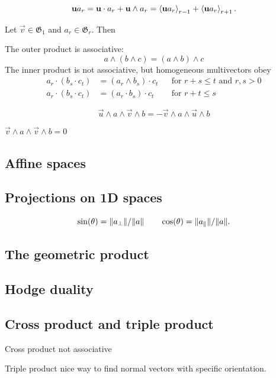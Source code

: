 \begin{lemma}
\[ \boldsymbol{\mathrm{u}}a_r = \boldsymbol{\mathrm{u}}\cdot a_r + \boldsymbol{\mathrm{u}}\wedge a_r = \left\langle \boldsymbol{\mathrm{u}}a_r \right\rangle_{r-1} + \left\langle \boldsymbol{\mathrm{u}}a_r \right\rangle_{r+1}. \]
\end{lemma}

\begin{proposition}
Let $\vec{v}\in\mathfrak{G}_1$ and $a_r\in\mathfrak{G}_r$. Then

\end{proposition}





\begin{lemma}
The outer product is associative:
\[ a\wedge(b\wedge c) = (a\wedge b)\wedge c \]
The inner product is not associative, but homogeneous multivectors obey
\begin{align*}
a_r\cdot(b_s \cdot c_t) &= (a_r\wedge b_s)\cdot c_t & &\text{for $r+s\leq t$ and $r,s>0$} \\
a_r\cdot(b_s \cdot c_t) &= (a_r\cdot b_s)\cdot c_t & &\text{for $r+t\leq s$}
\end{align*}
\end{lemma}

\begin{lemma}
\[ \vec{u}\wedge a\wedge \vec{v}\wedge b = -\vec{v}\wedge a\wedge \vec{u}\wedge b  \]
\end{lemma}
$\vec{v}\wedge a \wedge \vec{v} \wedge b = 0$

\subsection{Affine spaces}
\subsection{Projections on 1D spaces}
\[ \sin(\theta) = \lVert a_\perp\rVert/ \lVert a\rVert \qquad \cos(\theta) = \lVert a_\parallel\rVert/\lVert a\rVert. \]
\subsection{The geometric product}

\subsection{Hodge duality}
\subsection{Cross product and triple product}
Cross product not associative

Triple product nice way to find normal vectors with specific orientation.

